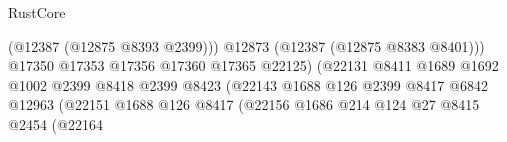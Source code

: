 \begin{lexlean}{RustCore}
\begin{coremodule}
                                                                  (@12387 (@12875 @8393 @2399)))
                                                                @12873
                                                                (@12387 (@12875 @8383 @8401)))
                                                              @17350
                                                              @17353
                                                              @17356
                                                              @17360
                                                              @17365
                                                              @22125)
                                                            (@22131
                                                              @8411
                                                              @1689
                                                              @1692
                                                              @1002
                                                              @2399
                                                              @8418
                                                              @2399
                                                              @8423
                                                              (@22143
                                                                @1688
                                                                @126
                                                                @2399
                                                                @8417
                                                                @6842
                                                                @12963
                                                                (@22151
                                                                  @1688
                                                                  @126
                                                                  @8417
                                                                  (@22156
                                                                    @1686
                                                                    @214
                                                                    @124
                                                                    @27
                                                                    @8415
                                                                    @2454
                                                                    (@22164

\end{coremodule}
\end{lexlean}
